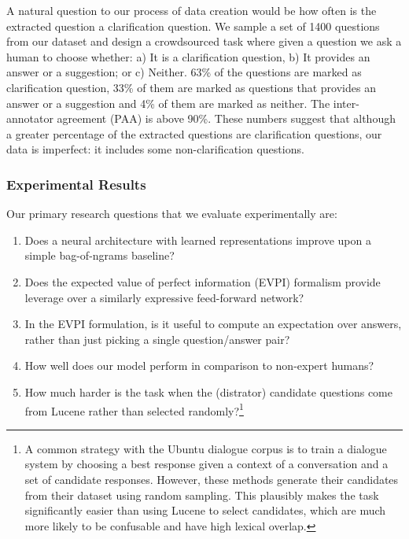 \documentclass[11pt]{article}
\begin{document}
A natural question to our process of data creation would be how often is the extracted question a clarification question. We sample a set of 1400 questions from our dataset and design a crowdsourced task where given a question we ask a human to choose whether: a) It is a clarification question, b) It provides an answer or a suggestion; or c) Neither.  63\% of the questions are marked as clarification question, 33\% of them are marked as questions that provides an answer or a suggestion and 4\% of them are marked as neither. The inter-annotator agreement (PAA) is above 90\%. These numbers suggest that although a greater percentage of the extracted questions are clarification questions, our data is imperfect: it includes some non-clarification questions.

\subsubsection{Experimental Results}\label{experiments_results}
Our primary research questions that we evaluate experimentally are:
%
\begin{enumerate}
\item Does a neural architecture with learned representations improve upon a simple bag-of-ngrams baseline?

\item Does the expected value of perfect information (EVPI) formalism provide leverage over a similarly expressive feed-forward network? %

\item In the EVPI formulation, is it useful to compute an expectation over answers, rather than just picking a single question/answer pair?

\item How well does our model perform in comparison to non-expert humans?

\item How much harder is the task when the (distrator) candidate questions come from Lucene rather than selected randomly?\footnote{A common strategy with the Ubuntu dialogue corpus \cite{lowe2015ubuntu} is to train a dialogue system by choosing a best response given a context of a conversation and a set of candidate responses. However, these methods generate their candidates from their dataset using random sampling. This plausibly makes the task significantly easier than using Lucene to select candidates, which are much more likely to be confusable and have high lexical overlap.}
\end{enumerate}
\end{document}
